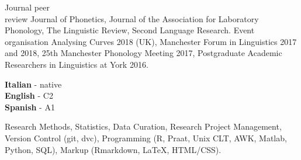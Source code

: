 \documentclass[9pt]{developercv} %
\begin{document}


\begin{entrylist}
	\entry
		{Journal peer \\ review}
		{\textnormal{Journal of Phonetics, Journal of the Association for Laboratory Phonology, The Linguistic Review, Second Language Research.}}
		{}
		{}
	\entry
		{Event organisation}
		{\textnormal{Analysing Curves 2018 (UK), Manchester Forum in Linguistics 2017 and 2018, 25th Manchester Phonology Meeting 2017, Postgraduate Academic Researchers in Linguistics at York 2016.}}
		{}
		{}
\end{entrylist}


\begin{minipage}[t]{0.3\textwidth}
	\vspace{-\baselineskip} %


	\textbf{Italian} - native\\
	\textbf{English} - C2 \\
	\textbf{Spanish} - A1
\end{minipage}
\begin{minipage}[t]{0.6\textwidth}
	\vspace{-\baselineskip} %


	Research Methods, Statistics, Data Curation, Research Project Management, Version Control (git, dvc), Programming (R, Praat, Unix CLT, AWK, Matlab, Python, SQL), Markup (Rmarkdown, \LaTeX{}, HTML/CSS).
\end{minipage}


\end{document}
